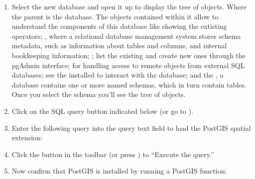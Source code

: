 \documentclass[a4paper,11pt,english]{sphinxmanual}
\begin{document}
\begin{enumerate}
\noindent{}

\item {} 
Select the new  database and open it up to display the tree of objects. Where the parent  is the database. The objects contained within it allow to understand the components of this database like showing the extisting  operators; , where a relational database management system stores schema metadata, such as information about tables and columns, and internal bookkeeping information; ; list the existing  and create new ones through the pgAdmin interface;  for handling access to remote objects from external SQL databases; see the installed  to interact with the database; and the , a database contains one or more named schemas, which in turn contain tables. Once you select the  schema you’ll see the tree of objects.

\noindent{}

\item {} 
Click on the SQL query button indicated below (or go to ).

\noindent{}

\item {} 
Enter the following query into the query text field to load the PostGIS spatial extension:

\begin{sphinxVerbatim}[commandchars=\\\{\}]
  
\end{sphinxVerbatim}

\item {} 
Click the  button in the toolbar (or press ) to “Execute the query.”

\item {} 
Now confirm that PostGIS is installed by running a PostGIS function:

\begin{sphinxVerbatim}[commandchars=\\\{\}]
 
\end{sphinxVerbatim}

\end{enumerate}
\end{document}
